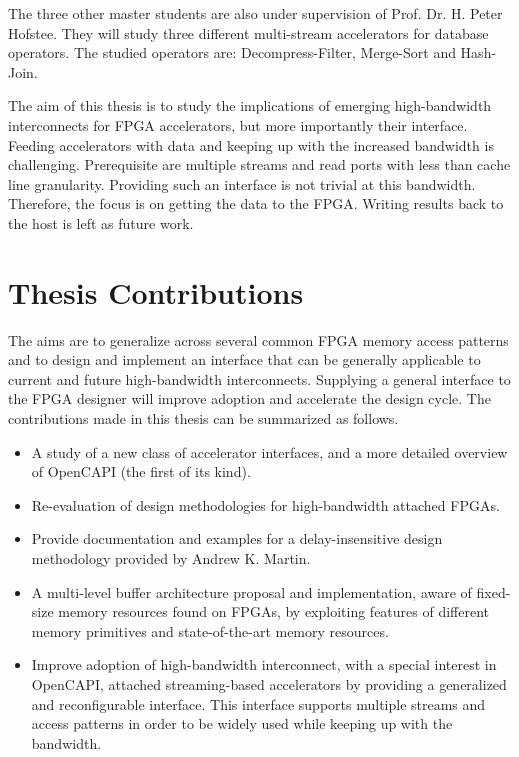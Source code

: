 The three other master students are also under supervision of Prof. Dr. H. Peter Hofstee. They will study three different multi-stream accelerators for database operators. The studied operators are: Decompress-Filter, Merge-Sort and Hash-Join.

The aim of this thesis is to study the implications of emerging high-bandwidth interconnects for FPGA accelerators, but more importantly their interface. Feeding accelerators with data and keeping up with the increased bandwidth is challenging. Prerequisite are multiple streams and read ports with less than cache line granularity. Providing such an interface is not trivial at this bandwidth. Therefore, the focus is on getting the data to the FPGA. Writing results back to the host is left as future work.





\section{Thesis Contributions}
The aims are to generalize across several common FPGA memory access patterns and to design and implement an interface that can be generally applicable to current and future high-bandwidth interconnects. Supplying a general interface to the FPGA designer will improve adoption and accelerate the design cycle. The contributions made in this thesis can be summarized as follows.
\begin{itemize}
  \item{A study of a new class of accelerator interfaces, and a more detailed overview of OpenCAPI (the first of its kind).}
  \item{Re-evaluation of design methodologies for high-bandwidth attached FPGAs.}
  \item{Provide documentation and examples for a delay-insensitive design methodology provided by Andrew K. Martin.}
  \item{A multi-level buffer architecture proposal and implementation, aware of fixed-size memory resources found on FPGAs, by exploiting features of different memory primitives and state-of-the-art memory resources.}
  \item{Improve adoption of high-bandwidth interconnect, with a special interest in OpenCAPI, attached streaming-based accelerators by providing a generalized and reconfigurable interface. This interface supports multiple streams and access patterns in order to be widely used while keeping up with the bandwidth.}
\end{itemize}





